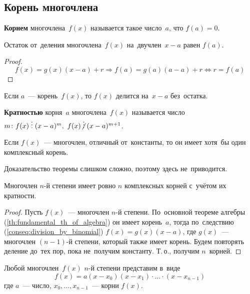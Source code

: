 \subsection{Корень многочлена}
\textbf{Корнем} многочлена~$f(x)$ называется такое число~$a$, что $f(a) = 0$.

\begin{theorem}[Безу]
Остаток от~деления многочлена~$f(x)$ на~двучлен~$x - a$ равен $f(a)$.
\end{theorem}
\begin{proof}
\begin{equation*}
f(x) = g(x)(x - a) + r \Rightarrow f(a) = g(a)(a - a) + r \Leftrightarrow r = f(a)
\end{equation*}
\end{proof}

\begin{consequent}
\label{conseq:division_by_binomial}
Если $a$~--- корень~$f(x)$, то $f(x)$ делится на~$x - a$ без~остатка.
\end{consequent}

\textbf{Кратностью} корня~$a$ многочлена~$f(x)$ называется число~
$m \colon f(x) \mult (x - a)^m, \ f(x) \notmult (x - a)^{m+1}$.


\begin{theorem}
\label{th:fundamental_th_of_algebra}
Если $f(x)$~--- многочлен, отличный от~константы, то он имеет хотя~бы один комплексный корень.
\end{theorem}%
Доказательство теоремы слишком сложно, поэтому здесь не~приводится.

\begin{consequent}
\label{conseq:n_roots_of_polynomial}
Многочлен $n$\nobreakdash-й степени имеет ровно $n$ комплексных корней с~учётом их кратности.
\end{consequent}
\begin{proof}
Пусть $f(x)$~--- многочлен $n$\nobreakdash-й степени.
По~основной теореме алгебры (\ref{th:fundamental_th_of_algebra}) он имеет корень~$a$, тогда по~следствию (\ref{conseq:division_by_binomial}) $f(x) = g(x)(x - a)$, где $g(x)$~--- многочлен $(n - 1)$\nobreakdash-й степени, который также имеет корень.
Будем повторять деление до~тех пор, пока не~получим константу.
Т.\,о., получим $n$~корней.
\end{proof}

\begin{consequent}
Любой многочлен~$f(x)$ $n$\nobreakdash-й степени представим в~виде
\begin{equation*}
f(x) = a(x - x_0)(x - x_1) \cdot \ldots \cdot (x - x_{n-1})
\end{equation*}
где $a$~--- число, $x_0, \ldots, x_{n-1}$~--- корни $f(x)$.
\end{consequent}

